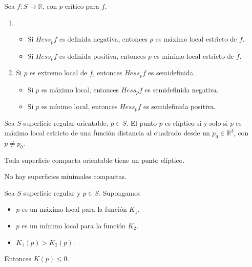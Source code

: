 \begin{proposition}
    Sea $f : S \to \mathbb{R}$, con $p$ crítico para $f$.
    \begin{enumerate}
        \item \begin{itemize}
                  \item Si $Hess_pf$ es definida negativa, entonces $p$ es máximo local estricto de $f$.
                  \item Si $Hess_pf$ es definida positiva, entonces $p$ es mínimo local estricto de $f$.
              \end{itemize}
        \item Si $p$ es extremo local de $f$, entonces $Hess_pf$ es semidefinida.
              \begin{itemize}
                  \item Si $p$ es máximo local, entonces $Hess_pf$ es semidefinida negativa.
                  \item Si $p$ es mínimo local, entonces $Hess_pf$ es semidefinida positiva.
              \end{itemize}
    \end{enumerate}
\end{proposition}

\begin{proposition}
    Sea $S$ superficie regular orientable, $p \in S$.
    El punto $p$ es elíptico si y solo si $p$ es máximo local estricto de una función distancia al cuadrado desde un $p_0 \in \mathbb{R}^3$, con $p \neq p_0$.
\end{proposition}

\begin{corollary}
    Toda superficie compacta orientable tiene un punto elíptico.
\end{corollary}

\begin{corollary}
    No hay superficies minimales compactas.
\end{corollary}

\begin{lemma}
    Sea $S$ superficie regular y $p \in S$. Supongamos
    \begin{itemize}
        \item $p$ es un máximo local para la función $K_1$.
        \item $p$ es un mínimo local para la función $K_2$.
        \item $K_1(p) > K_2(p)$.
    \end{itemize}
    Entonces $K(p) \leq 0$.
\end{lemma}

